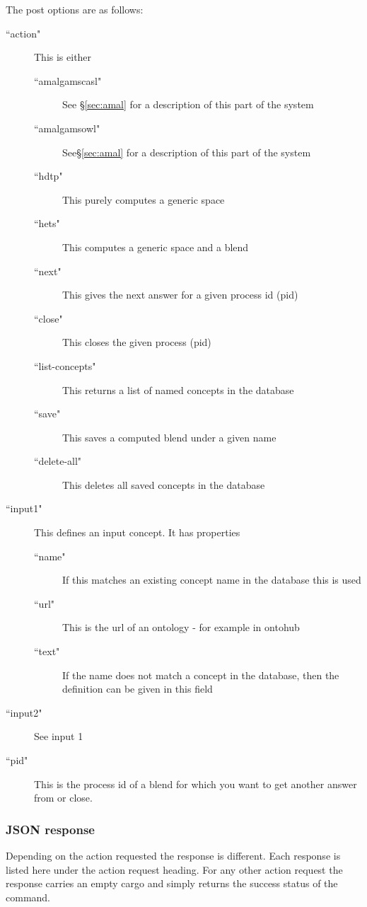 The post options are as follows:
\begin{description}
\item[``action"]This is either
\begin{description}
\item[``amalgamscasl"] See \S\ref{sec:amal} for a description of this part of the system
\item[``amalgamsowl"] See\S\ref{sec:amal} for a description of this part of the system
\item[``hdtp"] This purely computes a generic space
\item[``hets"] This computes a generic space and a blend
\item[``next"] This gives the next answer for a given process id (pid)
\item[``close"] This closes the given process (pid)
\item[``list-concepts"] This returns a list of named concepts in the database
\item[``save"] This saves a computed blend under a given name
\item[``delete-all"] This deletes all saved concepts in the database
\end{description}
\item[``input1"] This defines an input concept. It has properties
\begin{description}
\item[``name"]  If this matches an existing concept name in the database this is used
\item[``url"]  This is the url of an ontology - for example in ontohub
\item[``text"]  If the name does not match a concept in the database, then the definition can be given in this field
\end{description}
\item[``input2"] See input 1
\item[``pid"] This is the process id of a blend for which you want to get another answer from or close.
\end{description}

\subsubsection{JSON response}

Depending on the action requested the response is different. Each response is listed here under the action request heading. For any other action request the response carries an empty cargo and simply returns the success status of the command.

